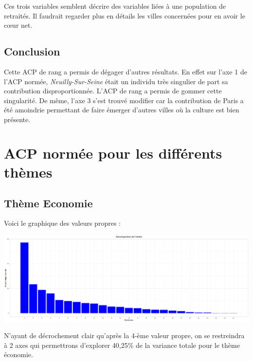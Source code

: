 \documentclass{article}
\begin{document}
\bigskip

Ces trois variables semblent décrire des variables liées à une population de retraités. Il faudrait regarder plus en détails les villes concernées pour en avoir le c\oe ur net. 

\subsection{Conclusion}

Cette ACP de rang a permis de dégager d'autres résultats. En effet sur l'axe 1 de l'ACP normée, \emph{Neuilly-Sur-Seine} était un individu très singulier de part sa contribution disproportionnée. L'ACP de rang a permis de gommer cette singularité. De même, l'axe 3 s'est trouvé modifier car la contribution de Paris a été amoindrie permettant de faire émerger d'autres villes où la culture est bien présente. 


\section{ACP normée pour les différents thèmes}

\subsection{Thème Economie} 
Voici le graphique des valeurs propres :

\centerline{\includegraphics[width=0.8\linewidth]{images/VP1}}
N'ayant de décrochement clair qu'après la 4-ème valeur propre, on se restreindra à 2 axes qui permettrons d'explorer 40,25\% de la variance totale pour le thème économie.
\end{document}
